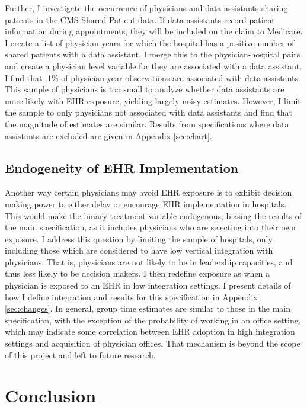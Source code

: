 \documentclass[12pt]{article}
\begin{document}
Further, I investigate the occurrence of physicians and data assistants sharing patients in the CMS Shared Patient data. If data assistants record patient information during appointments, they will be included on the claim to Medicare. I create a list of physician-years for which the hospital has a positive number of shared patients with a data assistant. I merge this to the physician-hospital pairs and create a physician level variable for they are associated with a data assistant. I find that .1\% of physician-year observations are associated with data assistants. This sample of physicians is too small to analyze whether data assistants are more likely with EHR exposure, yielding largely noisy estimates. However, I limit the sample to only physicians not associated with data assistants and find that the magnitude of estimates are similar. Results from specifications where data assistants are excluded are given in Appendix \ref{sec:chart}.

\subsection{Endogeneity of EHR Implementation}\label{sec:endogeneity}

Another way certain physicians may avoid EHR exposure is to exhibit decision making power to either delay or encourage EHR implementation in hospitals. This would make the binary treatment variable endogenous, biasing the results of the main specification, as it includes physicians who are selecting into their own exposure. I address this question by limiting the sample of hospitals, only including those which are considered to have low vertical integration with physicians. That is, physicians are not likely to be in leadership capacities, and thus less likely to be decision makers. I then redefine exposure as when a physician is exposed to an EHR in low integration settings. I present details of how I define integration and results for this specification in Appendix \ref{sec:changes}. In general, group time estimates are similar to those in the main specification, with the exception of the probability of working in an office setting, which may indicate some correlation between EHR adoption in high integration settings and acquisition of physician offices. That mechanism is beyond the scope of this project and left to future research. 


\section{Conclusion}
\end{document}
